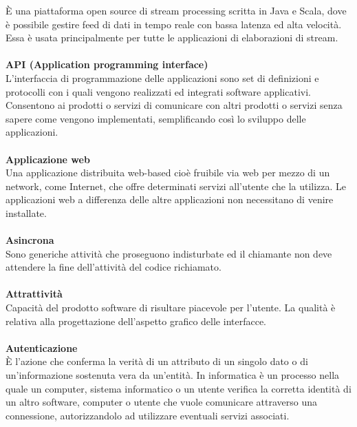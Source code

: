 È una piattaforma open source di stream processing scritta in Java e Scala, dove è possibile gestire feed di dati in tempo reale con bassa latenza ed alta velocità. Essa è usata principalmente per tutte le applicazioni di elaborazioni di stream.  \\ \\
\textbf{API (Application programming interface)}\\
L'interfaccia di programmazione delle applicazioni sono set di definizioni e protocolli con i quali vengono realizzati ed integrati software applicativi. Consentono ai  prodotti o servizi di comunicare con altri prodotti o servizi senza sapere come vengono implementati, semplificando così lo sviluppo delle applicazioni. \\ \\
\textbf{Applicazione web}\\
Una applicazione distribuita web-based cioè fruibile via web per mezzo di un network, come Internet, che offre determinati servizi all'utente che la utilizza. Le applicazioni web a differenza delle altre applicazioni non necessitano di venire installate. \\ \\
\textbf{Asincrona}\\
Sono generiche attività che proseguono indisturbate ed il chiamante non deve attendere la fine dell'attività del codice richiamato. \\ \\
\textbf{Attrattività}\\
Capacità del prodotto software di risultare piacevole per l'utente. La qualità è relativa alla progettazione dell'aspetto grafico delle interfacce.\\ \\
\textbf{Autenticazione}\\
È l’azione che conferma la verità di un attributo di un singolo dato o di un’informazione sostenuta vera da un’entità. In informatica è un processo nella quale un computer, sistema informatico o un utente verifica la corretta identità di un altro software, computer o utente che vuole comunicare attraverso una connessione, autorizzandolo  ad utilizzare eventuali servizi associati.
\clearpage